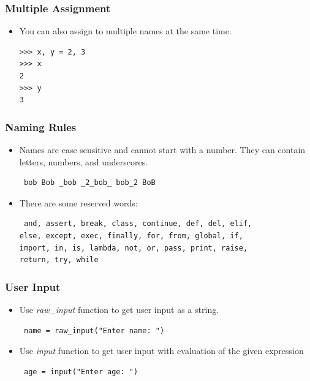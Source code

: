 \documentclass[12pt,handout]{beamer}
\begin{document}
\begin{frame}[fragile]
\frametitle{Multiple Assignment}

\begin{itemize}
\item You can also assign to multiple names at the same time.
\small{
\begin{verbatim}
>>> x, y = 2, 3
>>> x
2
>>> y
3
\end{verbatim}
}
\end{itemize}
\end{frame}

\begin{frame}[fragile]
\frametitle{Naming Rules}

\begin{itemize}
\item Names are case sensitive and cannot start with a number.
They can contain letters, numbers, and underscores.\\
\small{
\begin{verbatim}
 bob Bob _bob _2_bob_ bob_2 BoB
\end{verbatim}
}
\item There are some reserved words:\\
\small{
\begin{verbatim}
 and, assert, break, class, continue, def, del, elif,
else, except, exec, finally, for, from, global, if,
import, in, is, lambda, not, or, pass, print, raise,
return, try, while
\end{verbatim}
}
\end{itemize}
\end{frame}

\begin{frame}[fragile]
\frametitle{User Input}

\begin{itemize}
\item Use {\it raw\_input} function to get user input as a string.
\small{
\begin{verbatim}
 name = raw_input("Enter name: ")
\end{verbatim}
}
\item Use {\it input} function to get user input with evaluation
of the given expression
\small{
\begin{verbatim}
 age = input("Enter age: ")
\end{verbatim}
}
\end{itemize}
\end{frame}
\end{document}
